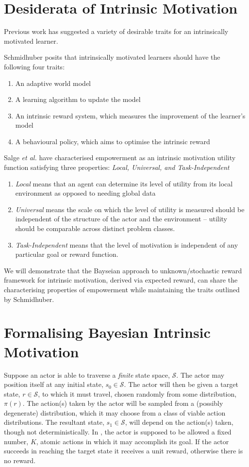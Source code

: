 \documentclass{article}
\newcommand{\Ss}{\mathcal{S}}
\begin{document}
\section{Desiderata of Intrinsic Motivation}
Previous work has suggested a variety of desirable traits for an intrinsically motivated learner.

Schmidhuber \cite{schmidhuber2010formal} posits that intrinsically motivated learners should have the following four traits:
\begin{enumerate}
\item An adaptive world model
\item A learning algorithm to update the model
\item An intrinsic reward system, which measures the improvement of the learner's model
\item A behavioural policy, which aims to optimise the intrinsic reward
\end{enumerate}

Salge \textit{et al.} \cite{salge2014empowerment} have characterised empowerment as an intrinsic motivation utility function satisfying three properties: \textit{Local, Universal, and Task-Independent}
\begin{enumerate}
\item \textit{Local} means that an agent can determine its level of utility from its local environment as opposed to needing global data\
\item \textit{Universal} means the scale on which the level of utility is measured should be independent of the structure of the actor and the environment -- utility should be comparable across distinct problem classes.
\item \textit{Task-Independent} means that the level of motivation is independent of any particular goal or reward function.
\end{enumerate}

We will demonstrate that the Bayseian approach to unknown/stochastic reward framework for intrinsic motivation, derived via expected reward, can share the characterising properties of empowerment while maintaining the traits outlined by Schmidhuber.  

\section{Formalising Bayesian Intrinsic Motivation}
Suppose an actor is able to traverse a \textit{finite} state space, $\Ss$. 
The actor may position itself at any initial state, $s_0\in \Ss$. 
The actor will then be given a target state, $r\in \Ss$, to which it must travel, chosen randomly from some distribution, $\pi(r)$. 
The action(s) taken by the actor will be sampled from a (possibly degenerate) distribution, which it may choose from a class of viable action distributions. 
The resultant state, $s_1\in\Ss$, will depend on the action(s) taken, though not deterministically.  
In \cite{mohamed2015variational}, the actor is supposed to be allowed a fixed number, $K$, atomic actions in which it may accomplish its goal.
If the actor succeeds in reaching the target state it receives a unit reward, otherwise there is no reward.
\end{document}
